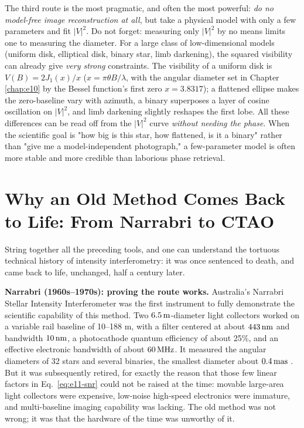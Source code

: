 The third route is the most pragmatic, and often the most powerful: \emph{do no model-free image reconstruction at all}, but take a physical model with only a few parameters and fit \(|V|^2\). Do not forget: measuring only \(|V|^2\) by no means limits one to measuring the diameter. For a large class of low-dimensional models (uniform disk, elliptical disk, binary star, limb darkening), the squared visibility can already give \emph{very strong} constraints. The visibility of a uniform disk is \(V(B)=2J_1(x)/x\) (\(x=\pi\theta B/\lambda\), with the angular diameter set in Chapter \ref{chap:e10} by the Bessel function's first zero \(x=3.8317\)); a flattened ellipse makes the zero-baseline vary with azimuth, a binary superposes a layer of cosine oscillation on \(|V|^2\), and limb darkening slightly reshapes the first lobe. All these differences can be read off from the \(|V|^2\) curve \emph{without needing the phase}. When the scientific goal is "how big is this star, how flattened, is it a binary" rather than "give me a model-independent photograph," a few-parameter model is often more stable and more credible than laborious phase retrieval.

\section{Why an Old Method Comes Back to Life: From Narrabri to CTAO}
\label{sec:e11-history}

String together all the preceding tools, and one can understand the tortuous technical history of intensity interferometry: it was once sentenced to death, and came back to life, unchanged, half a century later.

\textbf{Narrabri (1960s--1970s): proving the route works.} Australia's Narrabri Stellar Intensity Interferometer was the first instrument to fully demonstrate the scientific capability of this method. Two \(6.5\,{\rm m}\)-diameter light collectors worked on a variable rail baseline of 10--188 m, with a filter centered at about \(443\,{\rm nm}\) and bandwidth \(10\,{\rm nm}\), a photocathode quantum efficiency of about 25\%, and an effective electronic bandwidth of about \(60\,{\rm MHz}\). It measured the angular diameters of 32 stars and several binaries, the smallest diameter about \(0.4\,{\rm mas}\) \citep{1967MNRAS.137..375H,1967MNRAS.137..393H,1974MNRAS.167..121H,1974iiia.book.....H}. But it was subsequently retired, for exactly the reason that those few linear factors in Eq.~\eqref{eq:e11-snr} could not be raised at the time: movable large-area light collectors were expensive, low-noise high-speed electronics were immature, and multi-baseline imaging capability was lacking. The old method was not wrong; it was that the hardware of the time was unworthy of it.

